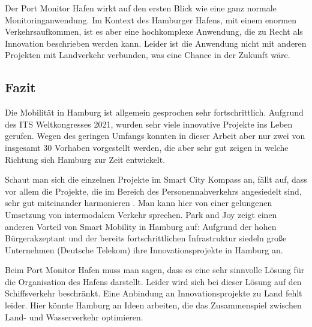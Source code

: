 Der Port Monitor Hafen wirkt auf den ersten Blick wie eine ganz normale Monitoringanwendung.
Im Kontext des Hamburger Hafens, mit einem enormen Verkehrsaufkommen, ist es aber eine hochkomplexe Anwendung, die zu Recht als Innovation beschrieben werden kann.
Leider ist die Anwendung nicht mit anderen Projekten mit Landverkehr verbunden, was eine Chance in der Zukunft wäre.

\subsection{Fazit}

Die Mobilität in Hamburg ist allgemein gesprochen sehr fortschrittlich. Aufgrund des ITS Weltkongresses 2021, wurden sehr viele innovative Projekte ins Leben gerufen.
Wegen des geringen Umfangs konnten in dieser Arbeit aber nur zwei von insgesamt 30 Vorhaben vorgestellt werden, die aber sehr gut zeigen in welche Richtung sich Hamburg zur Zeit entwickelt. 

Schaut man sich die einzelnen Projekte im Smart City Kompass an, fällt auf, dass vor allem die Projekte, die im Bereich des Personennahverkehrs angesiedelt sind, sehr gut miteinander harmonieren \autocite[vgl.][]{SmartCityKompass.2020d}.
Man kann hier von einer gelungenen Umsetzung von intermodalem Verkehr sprechen. Park and Joy zeigt einen anderen Vorteil von Smart Mobility in Hamburg auf: Aufgrund der hohen Bürgerakzeptant und der bereits fortschrittlichen Infrastruktur siedeln große Unternehmen (Deutsche Telekom) ihre Innovationsprojekte in Hamburg an.

Beim Port Monitor Hafen muss man sagen, dass es eine sehr sinnvolle Lösung für die Organisation des Hafens darstellt. Leider wird sich bei dieser Lösung auf den Schiffsverkehr beschränkt.
Eine Anbindung an Innovationsprojekte zu Land fehlt leider. Hier könnte Hamburg an Ideen arbeiten, die das Zusammenspiel zwischen Land- und Wasserverkehr optimieren.
